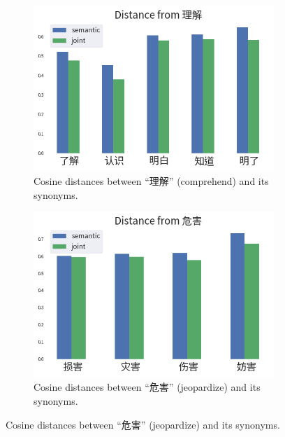 \begin{figure}[h!]
    \begin{CJK}{UTF8}{gbsn}
    \centering
    \begin{subfigure}[b]{0.44\textwidth}
        \centering
        \includegraphics[width=\textwidth]{../images/similarity_zh1.png}
        \caption{Cosine distances between ``理解'' (comprehend) and its synonyms.}
        \label{fig:similarity_zh1}
    \end{subfigure}
    \hspace{2em}
    \begin{subfigure}[b]{0.44\textwidth}
        \centering
        \includegraphics[width=\textwidth]{../images/similarity_zh2.png}
        \caption{Cosine distances between ``危害'' (jeopardize) and its synonyms.}
        \label{fig:similarity_zh2}
    \end{subfigure}

\end{CJK}
\end{figure}
